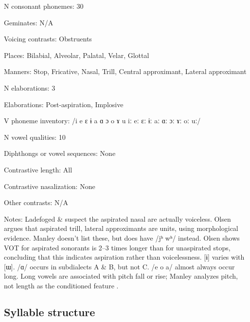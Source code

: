 {\begin{appendixdesc}
\item[N consonant phonemes:] 30

\item[Geminates:] N/A

\item[Voicing contrasts:] Obstruents

\item[Places:] Bilabial, Alveolar, Palatal, Velar, Glottal

\item[Manners:] Stop, Fricative, Nasal, Trill, Central approximant, Lateral approximant

\item[N elaborations:] 3

\item[Elaborations:] Post-aspiration, Implosive

\item[V phoneme inventory:] /i e ɛ ɨ a ɑ ɔ o ɤ u iː eː ɛː ɨː aː ɑː ɔː ɤː oː uː/

\item[N vowel qualities:] 10

\item[Diphthongs or vowel sequences:] None

\item[Contrastive length:] All

\item[Contrastive nasalization:] None

\item[Other contrasts:] N/A

\item[Notes:] Ladefoged \& \citet[116]{Maddieson1996} suspect the aspirated nasal are actually voiceless. Olsen argues that aspirated trill, lateral approximants are units, using morphological evidence. Manley doesn’t list these, but does have /jʰ wʰ/ instead. Olsen shows VOT for aspirated sonorants is 2--3 times longer than for unaspirated stops, concluding that this indicates aspiration rather than voicelessness. [ɨ] varies with [ɯ]. /ɑ/ occurs in subdialects A \& B, but not C. /e o a/ almost always occur long. Long vowels are associated with pitch fall or rise; Manley analyzes pitch, not length as the conditioned feature \citep[15]{Manley1972}.
\end{appendixdesc}
\subsection*{Syllable structure}
\begin{appendixdesc}


\end{appendixdesc}}
